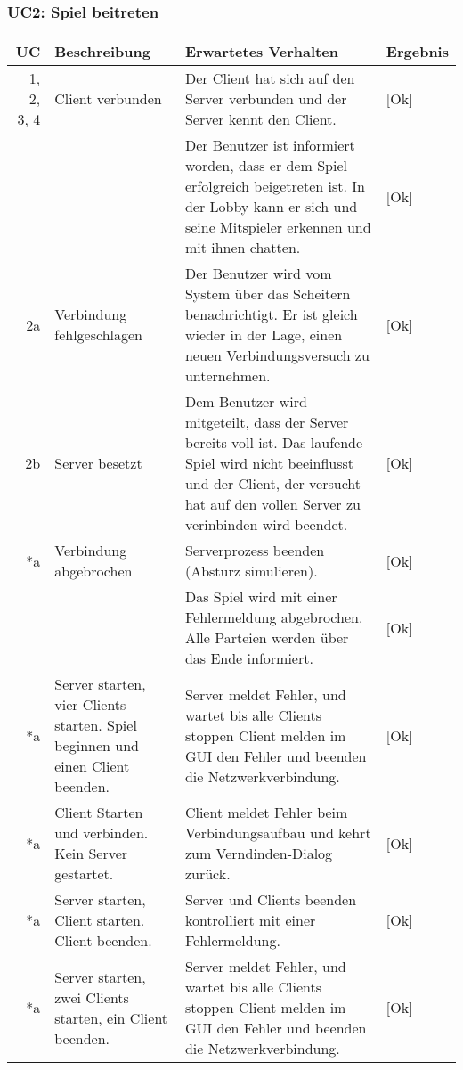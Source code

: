 \documentclass[12pt,halfparskip]{scrartcl}
\begin{document}
\subsubsection{UC2: Spiel beitreten}
	\begin {tabular}{r | p{3cm} | p{8cm} | l}
		\toprule
		\textbf{UC} & \textbf{Beschreibung} & \textbf{Erwartetes Verhalten} & \textbf{Ergebnis} \\
		\midrule
		1, 2, 3, 4 & Client verbunden & Der Client hat sich auf den Server verbunden und der Server kennt den Client. & [Ok] \\
		 \cline{3-4} & & Der Benutzer ist informiert worden, dass er dem Spiel erfolgreich beigetreten ist. In der Lobby kann er sich und seine Mitspieler erkennen und mit ihnen chatten. & [Ok] \\
		\midrule
		2a & Verbindung fehlgeschlagen & Der Benutzer wird vom System über das Scheitern benachrichtigt. Er ist gleich wieder in der Lage, einen neuen Verbindungsversuch zu unternehmen. & [Ok] \\
		\midrule
		2b & Server besetzt & Dem Benutzer wird mitgeteilt, dass der Server bereits voll ist. Das laufende Spiel wird nicht beeinflusst und der Client, der versucht hat auf den vollen Server zu verinbinden wird beendet. & [Ok] \\
		\midrule
		*a & Verbindung abgebrochen & Serverprozess beenden (Absturz simulieren). & [Ok]  \\
		\cline{3-4} & & Das Spiel wird mit einer Fehlermeldung abgebrochen. Alle Parteien werden über das Ende informiert. & [Ok] \\
		\midrule
		*a & Server starten, vier Clients starten. Spiel beginnen und einen Client beenden. & Server meldet Fehler, und wartet bis alle Clients stoppen Client melden im GUI den Fehler und beenden die Netzwerkverbindung. & [Ok] \\
		\midrule
		*a & Client Starten und verbinden. Kein Server gestartet. & Client meldet Fehler beim Verbindungsaufbau und kehrt zum Verndinden-Dialog zurück. & [Ok] \\
		\midrule
		*a & Server starten, Client starten. Client beenden. & Server und Clients beenden kontrolliert mit einer Fehlermeldung. & [Ok] \\
		\midrule
		*a & Server starten, zwei Clients starten, ein Client beenden. & Server meldet Fehler, und wartet bis alle Clients stoppen Client melden im GUI den Fehler und beenden die Netzwerkverbindung. & [Ok]  \\
		\bottomrule
	\end{tabular}
	
\end{document}
